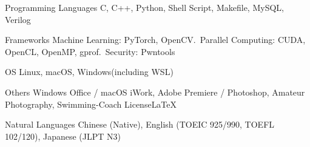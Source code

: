 

\begin{cvskills}

  \cvskill
    {Programming Languages} %
    {C, C++, Python, Shell Script, Makefile, MySQL, Verilog} %

  \cvskill
    {Frameworks} %
    {Machine Learning: PyTorch, OpenCV.\ Parallel Computing: CUDA, OpenCL, OpenMP, gprof.\ Security: Pwntools} %

  \cvskill
    {OS} %
    {Linux, macOS, Windows(including WSL)} %

  \cvskill
    {Others} %
    {Windows Office / macOS iWork, Adobe Premiere / Photoshop, Amateur Photography, Swimming-Coach License\LaTeX} %

  \cvskill
    {Natural Languages} %
    {Chinese (Native), English (TOEIC 925/990, TOEFL 102/120), Japanese (JLPT N3)} %

\end{cvskills}
